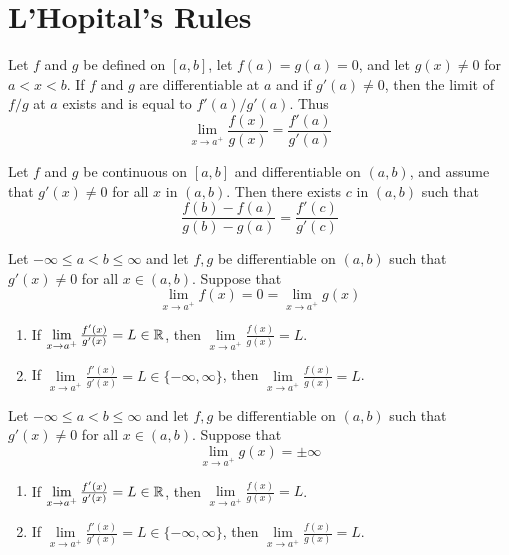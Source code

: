 \section{L'Hopital's Rules}

\begin{theorem}
	Let $f$ and $g$ be defined on $[a,b]$, let $f(a)=g(a)=0$, and let $g(x) \neq 0$ for $a < x < b$. If $f$ and $g$ are differentiable at $a$ and if $g'(a) \neq 0$, then the limit of $f/g$ at $a$ exists and is equal to $f'(a)/g'(a)$. Thus
	\[\lim\limits_{x\to a^+} \frac{f(x)}{g(x)} = \frac{f'(a)}{g'(a)}\]
\end{theorem}

\begin{theorem}
	Let $f$ and $g$ be continuous on $[a,b]$ and differentiable on $(a,b)$, and assume that $g'(x) \neq 0$ for all $x$ in $(a,b)$. Then there exists $c$ in $(a,b)$ such that
	\[\frac{f(b)-f(a)}{g(b)-g(a)}=\frac{f'(c)}{g'(c)}\]
\end{theorem}

\begin{theorem}
	Let $-\infty \leq a < b \leq \infty$ and let $f,g$ be differentiable on $(a,b)$ such that $g'(x) \neq 0$ for all $x \in (a,b)$. Suppose that
	\[\lim\limits_{x\to a^+} f(x) = 0 = \lim\limits_{x\to a^+} g(x)\]

	\begin{enumerate}
		\item If $\lim\limits_{x\to a^+} \frac{f'(x)}{g'(x)}=L \in \mathbb{R}$, then $\lim\limits_{x\to a^+} \frac{f(x)}{g(x)}=L$.

		\item If $\lim\limits_{x\to a^+} \frac{f'(x)}{g'(x)}=L \in \{-\infty, \infty\}$, then $\lim\limits_{x\to a^+} \frac{f(x)}{g(x)}=L$.
	\end{enumerate}
\end{theorem}

\begin{theorem}
	Let $-\infty \leq a < b \leq \infty$ and let $f,g$ be differentiable on $(a,b)$ such that $g'(x) \neq 0$ for all $x \in (a,b)$. Suppose that
	\[\lim\limits_{x\to a^+} g(x) = \pm \infty\]
	\begin{enumerate}
		\item If $\lim\limits_{x\to a^+} \frac{f'(x)}{g'(x)}=L \in \mathbb{R}$, then $\lim\limits_{x\to a^+} \frac{f(x)}{g(x)}=L$.

		\item If $\lim\limits_{x\to a^+} \frac{f'(x)}{g'(x)}=L \in \{-\infty, \infty\}$, then $\lim\limits_{x\to a^+} \frac{f(x)}{g(x)}=L$.
	\end{enumerate}
\end{theorem}
